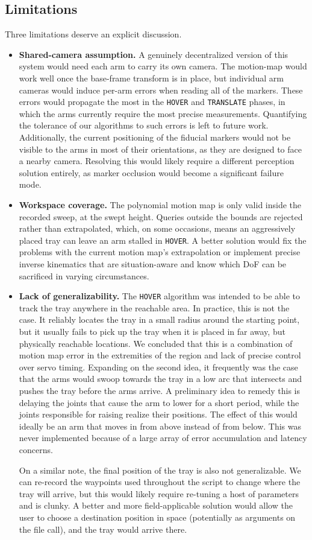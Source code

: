 \subsection{Limitations}
Three limitations deserve an explicit discussion.
\begin{itemize}
  \item \textbf{Shared-camera assumption.} A genuinely decentralized version of this system would need each arm to carry its own camera. The motion-map would work well once the base-frame transform is in place, but individual arm cameras would induce per-arm errors when reading all of the markers. These errors would propagate the most in the \texttt{HOVER} and \texttt{TRANSLATE} phases, in which the arms currently require the most precise measurements. Quantifying the tolerance of our algorithms to such errors is left to future work. Additionally, the current positioning of the fiducial markers would not be visible to the arms in most of their orientations, as they are designed to face a nearby camera. Resolving this would likely require a different perception solution entirely, as marker occlusion would become a significant failure mode.
  \item \textbf{Workspace coverage.} The polynomial motion map is only valid inside the recorded sweep, at the swept height. Queries outside the bounds are rejected rather than extrapolated, which, on some occasions, means an aggressively placed tray can leave an arm stalled in \texttt{HOVER}. A better solution would fix the problems with the current motion map's extrapolation or implement precise inverse kinematics that are situation-aware and know which DoF can be sacrificed in varying circumstances.
  \item \textbf{Lack of generalizability.} The \texttt{HOVER} algorithm was intended to be able to track the tray anywhere in the reachable area. In practice, this is not the case. It reliably locates the tray in a small radius around the starting point, but it usually fails to pick up the tray when it is placed in far away, but physically reachable locations. We concluded that this is a combination of motion map error in the extremities of the region and lack of precise control over servo timing. Expanding on the second idea, it frequently was the case that the arms would swoop towards the tray in a low arc that intersects and pushes the tray before the arms arrive. A preliminary idea to remedy this is delaying the joints that cause the arm to lower for a short period, while the joints responsible for raising realize their positions. The effect of this would ideally be an arm that moves in from above instead of from below. This was never implemented because of a large array of error accumulation and latency concerns.

  On a similar note, the final position of the tray is also not generalizable. We can re-record the waypoints used throughout the script to change where the tray will arrive, but this would likely require re-tuning a host of parameters and is clunky. A better and more field-applicable solution would allow the user to choose a destination position in space (potentially as arguments on the file call), and the tray would arrive there.
\end{itemize}

